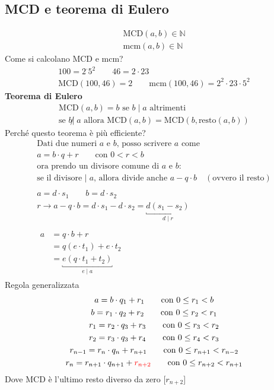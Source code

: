 \documentclass[italian]{article}
\newcommand{\mcd}[2]{\text{$\text{MCD}(#1, #2)$}}
\newcommand{\mcm}[2]{\text{$\text{mcm}(#1, #2)$}}
\newcommand{\N}{\text{$\mathbb{N}$}}
\newcommand{\divides}[2]{\text{$#1 \;|\; #2$}}
\begin{document}
\subsection{MCD e teorema di Eulero}
\begin{gather*}
	\mcd{a}{b} \in \N \\
	\mcm{a}{b} \in \N
\end{gather*}
Come si calcolano MCD e mcm?
\begin{gather*}
	100 = 2^ \cdot 5^2 \qquad 46=2\cdot 23\\
	\mcd{100}{46} = 2\qquad \mcm{100}{46}=2^2\cdot 23 \cdot 5^2
\end{gather*}
\textbf{Teorema di Eulero}
\begin{gather*}
	\mcd{a}{b} = b \text{ se } b\;|\;a \text{ altrimenti}\\
	\text{se } b \not| \; a \text{ allora } \mcd{a}{b} = \mcd{b}{\text{resto}(a,b)}
\end{gather*}
Perché questo teorema è più efficiente?
\begin{gather*}
	\text{Dati due numeri $a$ e $b$, posso scrivere $a$ come}\\
	a = b\cdot q + r \qquad \text{con } 0<r<b\\
	\text{ora prendo un divisore comune di $a$ e $b$}:\\
	\text{se il divisore } |\; a \text{, allora divide anche } a-q\cdot b \quad(\text{ovvero il resto}) \\\\
	a=d\cdot s_1 \qquad b=d\cdot s_2\\
	r \to a - q\cdot b = d\cdot s_1 - d\cdot s_2 = \underbracket{d(s_1 - s_2)}_{\divides{d}{r}}\\\\
	\begin{split}
		a &= q\cdot b + r \\
		&= q(e\cdot t_1) + e\cdot t_2 \\
		&= \underbracket{e(q\cdot t_1 + t_2)}_{\divides{e}{a}}
	\end{split}
\end{gather*}
Regola generalizzata
\begin{gather*}
	a = b\cdot q_1 +r_1 \qquad \text{con }0\leq r_1 < b \\
	b = r_1 \cdot q_2 + r_2 \qquad \text{con }0\leq r_2 < r_1 \\
	r_1 = r_2 \cdot q_3 + r_3 \qquad \text{con }0\leq r_3 < r_2 \\
	r_2 = r_3 \cdot q_3 + r_4 \qquad \text{con }0\leq r_4 < r_3 \\
	r_{n-1} = r_n \cdot q_{n} + r_{n+1} \qquad \text{con } 0\leq r_{n+1}<r_{n-2}\\
	r_{n} = r_{n+1} \cdot q_{n+1} + \textcolor{red}{ r_{n+2}} \qquad \text{con } 0\leq r_{n+2}<r_{n+1} \\
\end{gather*}
Dove MCD è l'ultimo resto diverso da zero [$r_{n+2}$]
\end{document}
